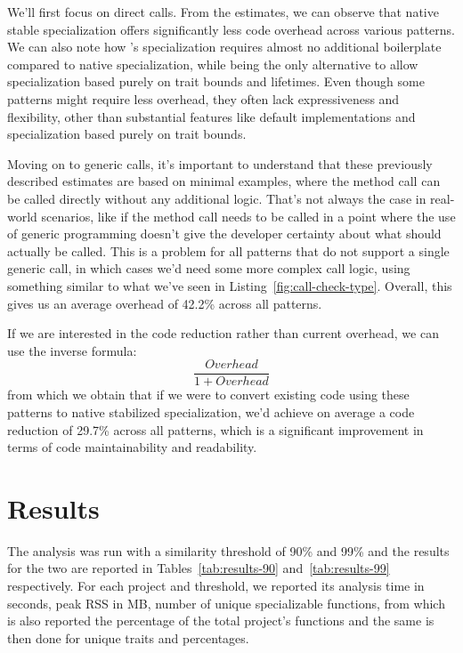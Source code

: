 We'll first focus on direct calls.
From the estimates, we can observe that native stable specialization offers significantly less code overhead across various patterns.
We can also note how \mytool{}'s specialization requires almost no additional boilerplate compared to native specialization, while being the only alternative to allow specialization based purely on trait bounds and lifetimes.
Even though some patterns might require less overhead, they often lack expressiveness and flexibility, other than substantial features like default implementations and specialization based purely on trait bounds.

Moving on to generic calls, it's important to understand that these previously described estimates are based on minimal examples, where the method call can be called directly without any additional logic.
That's not always the case in real-world scenarios, like if the method call needs to be called in a point where the use of generic programming doesn't give the developer certainty about what should actually be called.
This is a problem for all patterns that do not support a single generic call, in which cases we'd need some more complex call logic, using something similar to what we've seen in Listing~\ref{fig:call-check-type}.
Overall, this gives us an average overhead of 42.2\% across all patterns.

If we are interested in the code reduction rather than current overhead, we can use the inverse formula: $$\frac{Overhead}{1+Overhead}$$ from which we obtain that if we were to convert existing code using these patterns to native stabilized specialization, we'd achieve on average a code reduction of 29.7\% across all patterns, which is a significant improvement in terms of code maintainability and readability.


\section{Results}\label{evaluation-results}
The analysis was run with a similarity threshold of 90\% and 99\% and the results for the two are reported in Tables~\ref{tab:results-90} and~\ref{tab:results-99} respectively.
For each project and threshold, we reported its analysis time in seconds, peak RSS in MB, number of unique specializable functions, from which is also reported the percentage of the total project's functions and the same is then done for unique traits and percentages.

